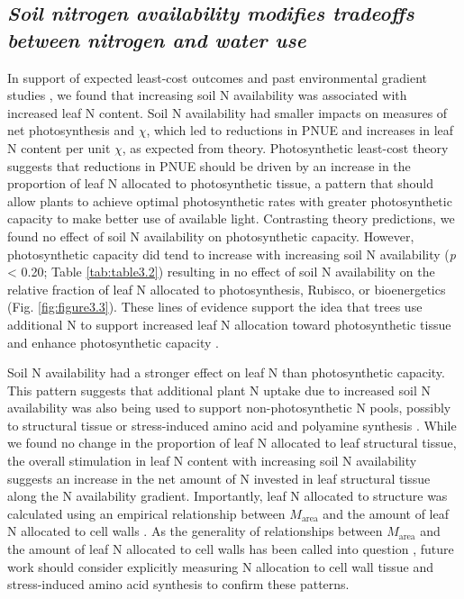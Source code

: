 \subsection{\textit{Soil nitrogen availability modifies tradeoffs between nitrogen and water use}}
In support of expected least-cost outcomes and past environmental gradient studies , we found that increasing soil N availability was associated with increased leaf N content. Soil N availability had smaller impacts on measures of net photosynthesis and $\chi$, which led to reductions in PNUE and increases in leaf N content per unit $\chi$, as expected from theory. Photosynthetic least-cost theory suggests that reductions in PNUE should be driven by an increase in the proportion of leaf N allocated to photosynthetic tissue, a pattern that should allow plants to achieve optimal photosynthetic rates with greater photosynthetic capacity to make better use of available light. Contrasting theory predictions, we found no effect of soil N availability on photosynthetic capacity. However, photosynthetic capacity did tend to increase with increasing soil N availability (\textit{p} < 0.20; Table \ref{tab:table3.2}) resulting in no effect of soil N availability on the relative fraction of leaf N allocated to photosynthesis, Rubisco, or bioenergetics (Fig. \ref{fig:figure3.3}). These lines of evidence support the idea that trees use additional N to support increased leaf N allocation toward photosynthetic tissue and enhance photosynthetic capacity .

Soil N availability had a stronger effect on leaf N than photosynthetic capacity. This pattern suggests that additional plant N uptake due to increased soil N availability was also being used to support non-photosynthetic N pools, possibly to structural tissue or stress-induced amino acid and polyamine synthesis . While we found no change in the proportion of leaf N allocated to leaf structural tissue, the overall stimulation in leaf N content with increasing soil N availability suggests an increase in the net amount of N invested in leaf structural tissue along the N availability gradient. Importantly, leaf N allocated to structure was calculated using an empirical relationship between $M_\mathrm{area}$ and the amount of leaf N allocated to cell walls . As the generality of relationships between $M_\mathrm{area}$ and the amount of leaf N allocated to cell walls has been called into question , future work should consider explicitly measuring N allocation to cell wall tissue and stress-induced amino acid synthesis to confirm these patterns.
    
